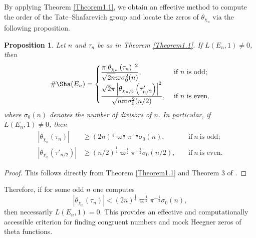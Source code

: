 \documentclass[11pt, reqno]{amsart}
\theoremstyle{plain}
\newtheorem{proposition}[theorem]{Proposition}
\theoremstyle{definition}
\numberwithin{equation}{section}
\begin{document}
By applying Theorem \ref{Theorem1.1}, we obtain an effective method to compute the order of the Tate–Shafarevich group and locate the zeros of $\theta_{\chi_n}$ via the following proposition.
\begin{proposition}\label{prop8.4}
    Let $n$ and $\tau_n$ be as in Theorem \ref{Theorem1.1}.  
If $L(E_n,1)\neq 0$, then 
\[
{\#\Sha(E_n)}=\begin{cases}\displaystyle
\frac{\pi|\theta_{\chi_{n}}\left(\tau_n\right)|^2}{\sqrt{2n}\varpi\sigma_0^2(n)},&\ \text{if}\ n \ \text{is odd};\\
\displaystyle\frac{\sqrt{2}\pi\left|\theta_{\chi_{n/2}}\left(\tau'_{n/2}\right)\right|^2}{\sqrt{n}\varpi\sigma_0^2(n/2)},&\ \text{if}\ n \ \text{is even},
\end{cases}
\]
where $\sigma_0(n)$ denotes the number of divisors of $n$. In particular, if $L(E_n,1)\neq 0$, then  
\[
\begin{aligned}
    |\theta_{\chi_{n}}\left(\tau_n\right)|&\geq {{(2n)^{\frac{1}{4 }}}\varpi^{\frac{1}{2}}\pi^{-\frac{1}{2}}}\sigma_0(n),& \ &\text{if}\ n\ \text{is odd};\\
|\theta_{\chi_{n}}\left(\tau'_{n/2}\right)|&\geq {{(n/2)^{\frac{1}{4 }}}\varpi^{\frac{1}{2}}\pi^{-\frac{1}{2}}}\sigma_0(n/2),& \ &\text{if}\ n\ \text{is even}. 
\end{aligned}
\]
\end{proposition}
\begin{proof}
This follows directly from  Theorem \ref{Theorem1.1} and Theorem 3 of \cite{Tunnell}.
\end{proof}
Therefore, if for some odd \(n\) one computes $$|\theta_{\chi_{n}}\left(\tau_n\right)|<{{(2n)^{\frac{1}{4 }}}\varpi^{\frac{1}{2}}\pi^{-\frac{1}{2}}}\sigma_0(n),$$  then necessarily $L(E_n,1)=0$. This provides an effective and computationally accessible criterion for finding congruent numbers and  mock Heegner zeros of theta functions.
\end{document}
